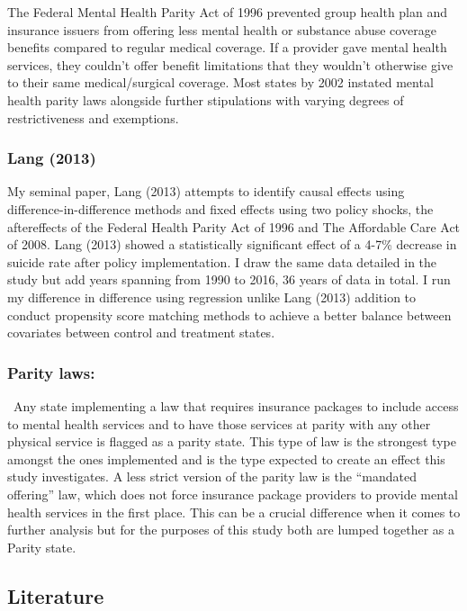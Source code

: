 \documentclass[
  12pt,
]{article}
\begin{document}
The Federal Mental Health Parity Act of 1996 prevented group health plan
and insurance issuers from offering less mental health or substance
abuse coverage benefits compared to regular medical coverage. If a
provider gave mental health services, they couldn't offer benefit
limitations that they wouldn't otherwise give to their same
medical/surgical coverage. Most states by 2002 instated mental health
parity laws alongside further stipulations with varying degrees of
restrictiveness and exemptions.

\hypertarget{lang-2013}{%
\subsubsection{Lang (2013)}\label{lang-2013}}

My seminal paper, Lang (2013) attempts to identify causal effects using
difference-in-difference methods and fixed effects using two policy
shocks, the aftereffects of the Federal Health Parity Act of 1996 and
The Affordable Care Act of 2008. Lang (2013) showed a statistically
significant effect of a 4-7\% decrease in suicide rate after policy
implementation. I draw the same data detailed in the study but add years
spanning from 1990 to 2016, 36 years of data in total. I run my
difference in difference using regression unlike Lang (2013) addition to
conduct propensity score matching methods to achieve a better balance
between covariates between control and treatment states.

\hypertarget{parity-laws}{%
\subsubsection{Parity laws:}\label{parity-laws}}

~Any state implementing a law that requires insurance packages to
include access to mental health services and to have those services at
parity with any other physical service is flagged as a parity state.
This type of law is the strongest type amongst the ones implemented and
is the type expected to create an effect this study investigates. A less
strict version of the parity law is the ``mandated offering'' law, which
does not force insurance package providers to provide mental health
services in the first place. This can be a crucial difference when it
comes to further analysis but for the purposes of this study both are
lumped together as a Parity state.

\hypertarget{literature}{%
\subsection{Literature}\label{literature}}
\end{document}
